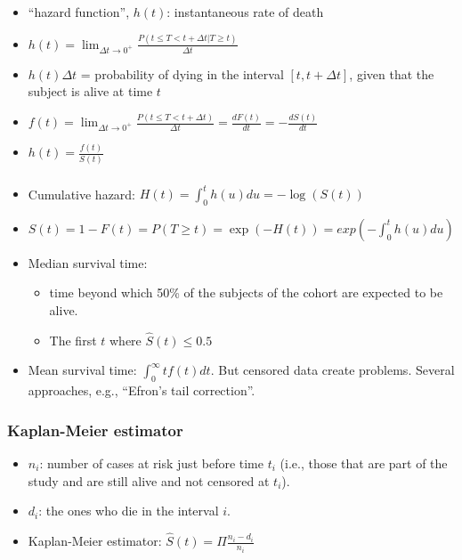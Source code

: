 \begin{frame}
\frametitle{}
\begin{itemize}
\item ``hazard function'', $h(t)$: instantaneous rate of death
\item $h(t) = \lim_{\Delta t \rightarrow 0^+} \frac{P(t \le T < t +
      \Delta t | T \ge t)}{\Delta t} $
\item $h(t) \Delta t$ = probability of dying in the interval
   $\left[t, t + \Delta t \right]$, given that the subject is alive at
   time  $t$
\item $f(t) = \lim_{\Delta t \rightarrow 0^+} 
\frac{P(t \le T < t + \Delta t)}{\Delta t} = 
\frac{dF(t)}{dt} = - \frac{dS(t)}{dt} $
\item $h(t) = \frac{f(t)}{S(t)}$
\end{itemize}
\end{frame}


\begin{frame}
\frametitle{}
\begin{itemize}
\item Cumulative hazard: $H(t) = \int_0^t h(u)du = -\log(S(t))$
\item $S(t) = 1 -F(t) = P(T \ge t) = \exp(-H(t)) = exp(-\int_0^t h(u)du)$
\item Median survival time: 
\begin{itemize}
\item time beyond which 50\% of the subjects of the cohort are expected to
  be alive.
\item The first $t$ where $\hat{S}(t) \le 0.5$
\end{itemize}
\item Mean survival time:  $\int_0^{\infty} t f(t) dt$. But censored data
  create problems. Several approaches, e.g.,
  ``Efron's tail correction''. 
\end{itemize}

\end{frame}



\begin{frame}
\frametitle{Kaplan-Meier estimator}
\begin{itemize}
\item $n_i$: number of cases at risk just before time $t_i$ (i.e.,
  those that are part of the study and are still alive and not censored at
    $t_i$).
\item $d_i$: the ones who die in the interval $i$.
\item Kaplan-Meier estimator: $\hat{S}(t) = \Pi \frac{n_i - d_i}{n_i}$
\end{itemize}
\end{frame}




